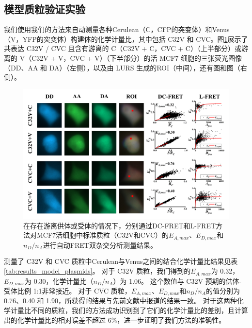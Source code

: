 \subsection{模型质粒验证实验}

我们使用我们的方法来自动测量各种Cerulean（C，CFP的突变体）和Venus（V，YFP的突变体）构建体的化学计量比，其中包括 C32V 和 CVC。图\ref{fig:results_model_plasmids}展示了共表达 C32V / CVC 且含有游离的 C（C32V + C，CVC + C）（上半部分）或游离的 V（C32V + V，CVC + V）（下半部分）的活 MCF7 细胞的三张荧光图像（DD、AA 和 DA）（左侧），以及由 LURS 生成的ROI（中间），还有图和图（右侧）。

\begin{figure}[htbp]
    \centering
    \includegraphics[width=1\linewidth]{../figures/3/3_模型质粒实验结果.png}
    \caption[模型质粒验证实验结果]{在存在游离供体或受体的情况下，分别通过DC-FRET和L-FRET方法对MCF7活细胞中标准质粒（C32V和CVC）的$E_{A, max}$、$E_{D, max}$和$n_D/n_A$进行自动FRET双杂交分析测量结果。}
    \label{fig:results_model_plasmids}
\end{figure}

测量了 C32V 和 CVC 质粒中Cerulean与Venus之间的结合化学计量比结果见表\ref{tab:results_model_plasmids}。
对于 C32V 质粒，我们得到的$E_{A,max}$为 0.32，$E_{D,max}$为 0.30，化学计量比（$n_D/n_A$）为 1.06。
这个数值与 C32V 预期的供体-受体比例 1:1非常接近。
对于 CVC 质粒，$E_{A,max}$、$E_{D,max}$和$n_D/n_A$的值分别为 0.76、0.40 和 1.90，所获得的结果与先前文献中报道的结果一致。
对于这两种化学计量比不同的质粒，我们的方法成功识别到了它们的化学计量比的差别，且计算出的化学计量比的相对误差不超过 6\%，进一步证明了我们方法的准确性。

